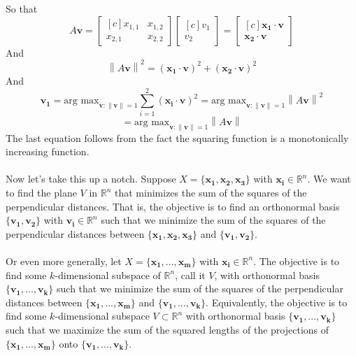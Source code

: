 \documentclass{tufte-handout}
\newcommand{\norm}[1]{\left\lVert#1\right\rVert}
\begin{document}
So that
\[
A\mathbf{v}=
\begin{bmatrix*}[c]
x_{1,1}&x_{1,2}\\
x_{2,1}&x_{2,2}
\end{bmatrix*}
\begin{bmatrix*}[c]
v_1\\v_2
\end{bmatrix*}
=
\begin{bmatrix*}[c]
\mathbf{x_1}\cdot\mathbf{v}\\\mathbf{x_2}\cdot\mathbf{v}
\end{bmatrix*}
\]
And
\[
\norm{A\mathbf{v}}^2=
(\mathbf{x_1}\cdot\mathbf{v})^2
+(\mathbf{x_2}\cdot\mathbf{v})^2
\]
And
\[
\mathbf{v_1}=\text{arg max}
_{\mathbf{v}:\norm{\mathbf{v}}=1}\sum_{i=1}^{2}(\mathbf{x_i}\cdot\mathbf{v})^2
=
\text{arg max}_{\mathbf{v}:\norm{\mathbf{v}}=1}\norm{A\mathbf{v}}^2
\]
\[
=
\text{arg max}_{\mathbf{v}:\norm{\mathbf{v}}=1}\norm{A\mathbf{v}}
\]
The last equation follows from the fact the squaring function is a monotonically increasing function.\\\leavevmode\\

\noindent Now let's take this up a notch. Suppose $X=\{\mathbf{x_1},\mathbf{x_2}, \mathbf{x_3}\}$ with $\mathbf{x_i}\in\mathbb{R}^n$. We want to find the plane $V$ in $\mathbb{R}^n$ that minimizes the sum of the squares of the perpendicular distances. That is, the objective is to find an orthonormal basis $\{\mathbf{v_1},\mathbf{v_2}\}$ with $\mathbf{v_i}\in\mathbb{R}^n$ such that we minimize the sum of the squares of the perpendicular distances between $\{\mathbf{x_1},\mathbf{x_2}, \mathbf{x_3}\}$ and $\{\mathbf{v_1}, \mathbf{v_2}\}$.\\\leavevmode\\


\noindent Or even more generally, let $X=\{\mathbf{x_1},...,\mathbf{x_m}\}$ with $\mathbf{x_i}\in\mathbb{R}^n$. The objective is to find some $k$-dimensional subspace of $\mathbb{R}^n$, call it $V$, with orthonormal basis $\{\mathbf{v_1},...,\mathbf{v_k}\}$ such that we minimize the sum of the squares of the perpendicular distances between $\{\mathbf{x_1},...,\mathbf{x_m}\}$ and $\{\mathbf{v_1},...,\mathbf{v_k}\}$. Equivalently, the objective is to find some $k$-dimensional subspace $V\subset\mathbb{R}^n$ with orthonormal basis $\{\mathbf{v_1},...,\mathbf{v_k}\}$ such that we maximize the sum of the squared lengths of the projections of $\{\mathbf{x_1},...,\mathbf{x_m}\}$ onto $\{\mathbf{v_1},...,\mathbf{v_k}\}$.\\\leavevmode\\
\end{document}
